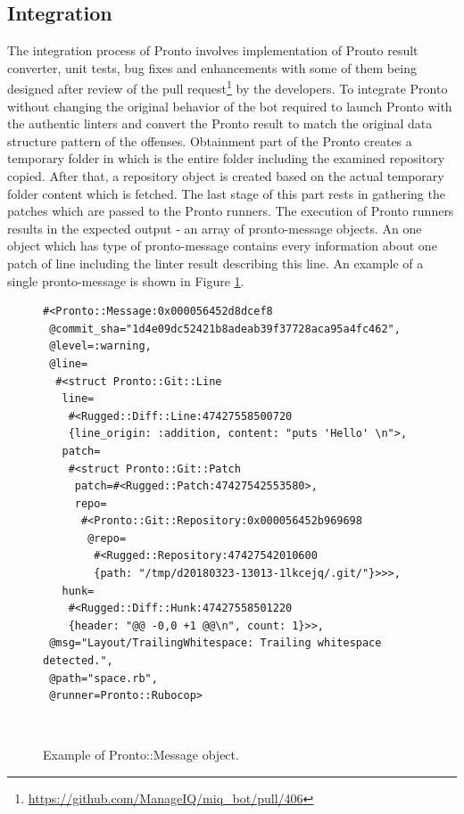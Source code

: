 \subsection{Integration}

The integration process of Pronto involves implementation of Pronto result converter, unit tests, bug fixes and enhancements with some of them being designed after review of the pull request\footnote{\url{https://github.com/ManageIQ/miq_bot/pull/406}} by the developers. To integrate Pronto without changing the original behavior of the bot required to launch Pronto with the authentic linters and convert the Pronto result to match the original data structure pattern of the offenses. Obtainment part of the Pronto creates a temporary folder in which is the entire folder including the examined repository copied. After that, a repository object is created based on the actual temporary folder content which is fetched. The last stage of this part rests in gathering the patches which are passed to the Pronto runners. The execution of Pronto runners results in the expected output - an array of pronto-message objects. An one object which has type of pronto-message contains every information about one patch of line including the linter result describing this line. An example of a single pronto-message is shown in Figure \ref{fig:pronto_message}.

\begin{figure}[H]
\begin{lstlisting}[basicstyle=\scriptsize, xleftmargin=.21\textwidth]
#<Pronto::Message:0x000056452d8dcef8
 @commit_sha="1d4e09dc52421b8adeab39f37728aca95a4fc462",
 @level=:warning,
 @line=
  #<struct Pronto::Git::Line
   line=
    #<Rugged::Diff::Line:47427558500720
    {line_origin: :addition, content: "puts 'Hello' \n">,
   patch=
    #<struct Pronto::Git::Patch
     patch=#<Rugged::Patch:47427542553580>,
     repo=
      #<Pronto::Git::Repository:0x000056452b969698
       @repo=
        #<Rugged::Repository:47427542010600
        {path: "/tmp/d20180323-13013-1lkcejq/.git/"}>>>,
   hunk=
    #<Rugged::Diff::Hunk:47427558501220
    {header: "@@ -0,0 +1 @@\n", count: 1}>>,
 @msg="Layout/TrailingWhitespace: Trailing whitespace detected.",
 @path="space.rb",
 @runner=Pronto::Rubocop>
\end{lstlisting}
\hfill\\[-3em]
\caption{Example of Pronto::Message object.}
\label{fig:pronto_message}
\end{figure}

